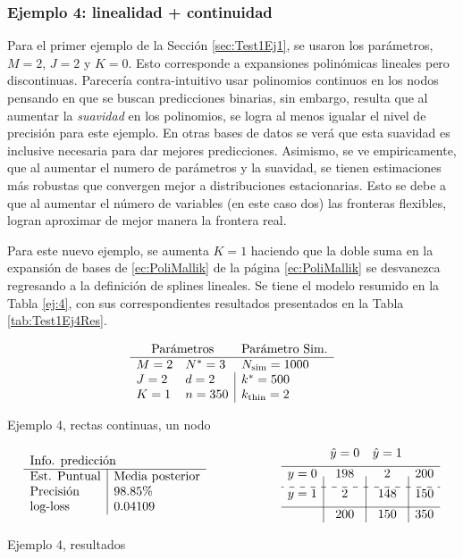 \documentclass[../Main/Main.tex]{subfiles}
\begin{document}
\subsubsection*{Ejemplo 4: linealidad + continuidad}
Para el primer ejemplo de la Sección \ref{sec:Test1Ej1}, se usaron los parámetros, $M = 2$, $J = 2$ y $K = 0$. Esto corresponde a expansiones polinómicas lineales pero discontinuas. Parecería contra-intuitivo usar polinomios continuos en los nodos pensando en que se buscan predicciones binarias, sin embargo, resulta que al aumentar la \textit{suavidad} en los polinomios, se logra al menos igualar el nivel de precisión para este ejemplo. En otras bases de datos se verá que esta suavidad es inclusive necesaria para dar mejores predicciones. Asimismo, se ve empiricamente, que al aumentar el numero de parámetros y la suavidad, se tienen estimaciones más robustas que convergen mejor a distribuciones estacionarias. Esto se debe a que al aumentar el número de variables (en este caso dos) las fronteras flexibles, logran aproximar de mejor manera la frontera real. 

Para este nuevo ejemplo, se aumenta $K = 1$ haciendo que la doble suma en la expansión de bases de \ref{ec:PoliMallik} de la página \ref{ec:PoliMallik} se desvanezca regresando a la definición de splines lineales. Se tiene el modelo resumido en la Tabla \ref{ej:4}, con sus correspondientes resultados presentados en la Tabla \ref{tab:Test1Ej4Res}. 

\begin{table}[h]
$$\paramsmod{2}{2}{1}{3}{2}{350}{1000}{500}{2}$$
\caption{Ejemplo 4, rectas continuas, un nodo}
\label{ej:4}
\end{table}

\begin{table}[h]
\begin{align*}
\resultados{\text{Media posterior}}{98.85}{0.04109}
\qquad\qquad\qquad
\matconf{198}{2}{200}{2}{148}{150}{200}{150}{350}
\end{align*}
\caption{Ejemplo 4, resultados}
\label{tab:Test1Ej4Res}
\end{table}
\end{document}
